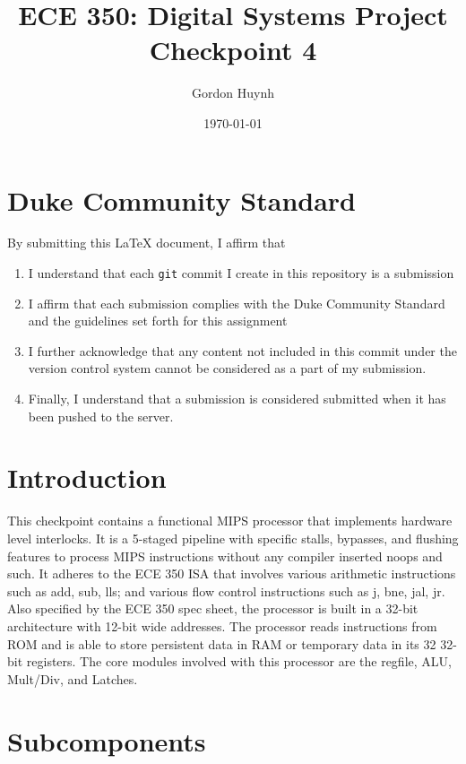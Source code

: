 \documentclass[letterpaper]{article} %
\begin{document}
\title{ECE 350: Digital Systems Project Checkpoint 4}
\author{Gordon Huynh} %
\date{\today} %
\maketitle

\section*{Duke Community Standard}

By submitting this \LaTeX{} document, I affirm that
\begin{enumerate}
    \item I understand that each \texttt{git} commit I create in this repository is a submission
    \item I affirm that each submission complies with the Duke Community Standard and the guidelines set forth for this assignment
    \item I further acknowledge that any content not included in this commit under the version control system cannot be considered as a part of my submission.
    \item Finally, I understand that a submission is considered submitted when it has been pushed to the server.
\end{enumerate}

\newpage

\section*{Introduction}

This checkpoint contains a functional MIPS processor that implements hardware level interlocks. It is a 5-staged pipeline with specific stalls, bypasses, and flushing features to process MIPS instructions without any compiler inserted noops and such. It adheres to the ECE 350 ISA that involves various arithmetic instructions such as add, sub, lls; and various flow control instructions such as j, bne, jal, jr. Also specified by the ECE 350 spec sheet, the processor is built in a 32-bit architecture with 12-bit wide addresses. The processor reads instructions from ROM and is able to store persistent data in RAM or temporary data in its 32 32-bit registers. The core modules involved with this processor are the regfile, ALU, Mult/Div, and Latches.

\section*{Subcomponents}
\end{document}
